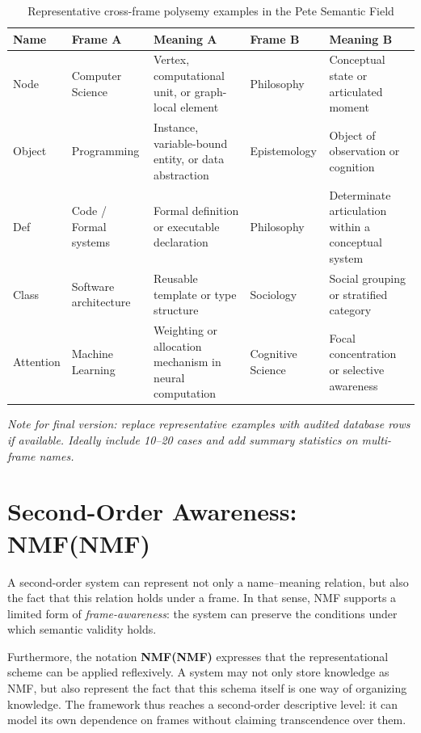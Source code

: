 \documentclass[11pt,a4paper]{article}
\newcommand{\term}[1]{\textbf{#1}}
\begin{document}
\begin{table}[H]
\centering
\caption{Representative cross-frame polysemy examples in the Pete Semantic Field}
\label{tab:polysemy}
\renewcommand{\arraystretch}{1.2}
\begin{tabularx}{\textwidth}{@{}>{\raggedright\arraybackslash}p{2.2cm} >{\raggedright\arraybackslash}p{2.6cm} >{\raggedright\arraybackslash}X >{\raggedright\arraybackslash}p{2.6cm} >{\raggedright\arraybackslash}X@{}}
\toprule
\textbf{Name} & \textbf{Frame A} & \textbf{Meaning A} & \textbf{Frame B} & \textbf{Meaning B} \\
\midrule
Node & Computer Science & Vertex, computational unit, or graph-local element & Philosophy & Conceptual state or articulated moment \\
Object & Programming & Instance, variable-bound entity, or data abstraction & Epistemology & Object of observation or cognition \\
Def & Code / Formal systems & Formal definition or executable declaration & Philosophy & Determinate articulation within a conceptual system \\
Class & Software architecture & Reusable template or type structure & Sociology & Social grouping or stratified category \\
Attention & Machine Learning & Weighting or allocation mechanism in neural computation & Cognitive Science & Focal concentration or selective awareness \\
\bottomrule
\end{tabularx}
\end{table}

\textit{Note for final version: replace representative examples with audited database rows if available. Ideally include 10--20 cases and add summary statistics on multi-frame names.}

\section{Second-Order Awareness: NMF(NMF)}

A second-order system can represent not only a name--meaning relation, but also the fact that this relation holds under a frame. In that sense, NMF supports a limited form of \textit{frame-awareness}: the system can preserve the conditions under which semantic validity holds.

Furthermore, the notation \term{NMF(NMF)} expresses that the representational scheme can be applied reflexively. A system may not only store knowledge as NMF, but also represent the fact that this schema itself is one way of organizing knowledge. The framework thus reaches a second-order descriptive level: it can model its own dependence on frames without claiming transcendence over them.
\end{document}
